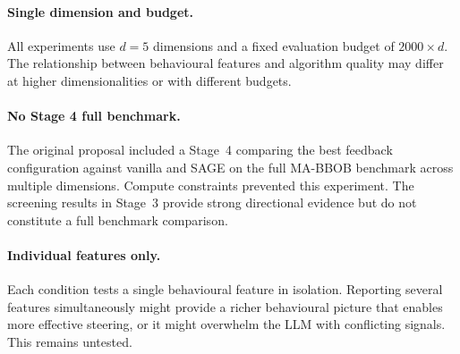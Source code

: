 \paragraph{Single dimension and budget.}
All experiments use $d = 5$ dimensions and a fixed evaluation budget of $2000 \times d$. The relationship between behavioural features and algorithm quality may differ at higher dimensionalities or with different budgets.

\paragraph{No Stage 4 full benchmark.}
The original proposal included a Stage~4 comparing the best feedback configuration against vanilla and SAGE on the full MA-BBOB benchmark across multiple dimensions. Compute constraints prevented this experiment. The screening results in Stage~3 provide strong directional evidence but do not constitute a full benchmark comparison.

\paragraph{Individual features only.}
Each condition tests a single behavioural feature in isolation. Reporting several features simultaneously might provide a richer behavioural picture that enables more effective steering, or it might overwhelm the LLM with conflicting signals. This remains untested.
